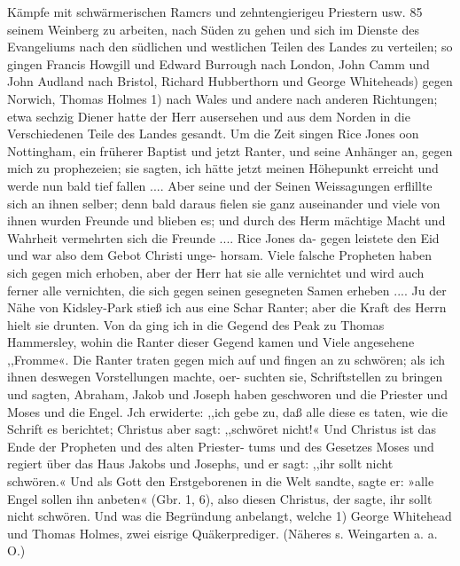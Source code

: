 Kämpfe mit schwärmerischen Ramcrs und zehntengierigeu Priestern usw. 85
seinem Weinberg zu arbeiten, nach Süden zu gehen und sich im
Dienste des Evangeliums nach den südlichen und westlichen Teilen
des Landes zu verteilen; so gingen Francis Howgill und Edward
Burrough nach London, John Camm und John Audland nach
Bristol, Richard Hubberthorn und George Whiteheads) gegen
Norwich, Thomas Holmes 1) nach Wales und andere nach anderen
Richtungen; etwa sechzig Diener hatte der Herr ausersehen und
aus dem Norden in die Verschiedenen Teile des Landes gesandt.
Um die Zeit singen Rice Jones oon Nottingham, ein früherer
Baptist und jetzt Ranter, und seine Anhänger an, gegen mich
zu prophezeien; sie sagten, ich hätte jetzt meinen Höhepunkt
erreicht und werde nun bald tief fallen .... Aber seine und
der Seinen Weissagungen erflillte sich an ihnen selber; denn bald
daraus fielen sie ganz auseinander und viele von ihnen wurden
Freunde und blieben es; und durch des Herm mächtige Macht und
Wahrheit vermehrten sich die Freunde .... Rice Jones da-
gegen leistete den Eid und war also dem Gebot Christi unge-
horsam. Viele falsche Propheten haben sich gegen mich erhoben,
aber der Herr hat sie alle vernichtet und wird auch ferner alle
vernichten, die sich gegen seinen gesegneten Samen erheben ....
Ju der Nähe von Kidsley-Park stieß ich aus eine Schar
Ranter; aber die Kraft des Herrn hielt sie drunten. Von da
ging ich in die Gegend des Peak zu Thomas Hammersley,
wohin die Ranter dieser Gegend kamen und Viele angesehene
,,Fromme«. Die Ranter traten gegen mich auf und fingen an
zu schwören; als ich ihnen deswegen Vorstellungen machte, oer-
suchten sie, Schriftstellen zu bringen und sagten, Abraham, Jakob
und Joseph haben geschworen und die Priester und Moses und
die Engel. Jch erwiderte: ,,ich gebe zu, daß alle diese es taten,
wie die Schrift es berichtet; Christus aber sagt: ,,schwöret nicht!«
Und Christus ist das Ende der Propheten und des alten Priester-
tums und des Gesetzes Moses und regiert über das Haus Jakobs
und Josephs, und er sagt: ,,ihr sollt nicht schwören.« Und als
Gott den Erstgeborenen in die Welt sandte, sagte er: »alle Engel
sollen ihn anbeten« (Gbr. 1, 6), also diesen Christus, der sagte, ihr
sollt nicht schwören. Und was die Begründung anbelangt, welche
1) George Whitehead und Thomas Holmes, zwei eisrige Quäkerprediger.
(Näheres s. Weingarten a. a. O.)


